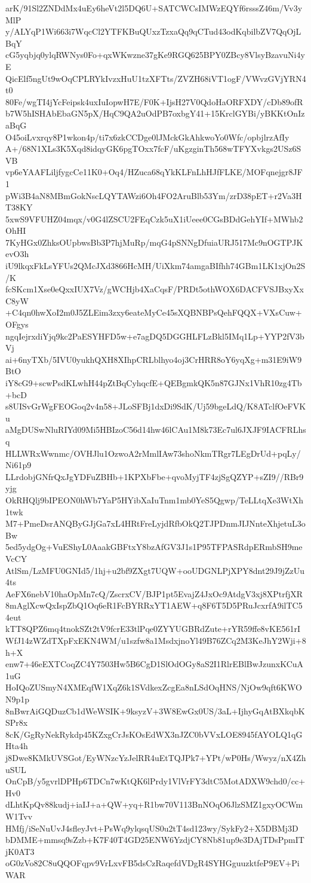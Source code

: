 arK/91Sl2ZNDdMx4uEy6heVt2l5DQ6U+SATCWCsIMWzEQYf6rsssZ46m/Vv3yMlP
y/ALYqP1Wi663i7WqcCl2YTFKBuQUxzTzxaQq9qCTud43odKqbilbZV7QqOjLBqY
cG5yqbjq0ylqRWNys0Fo+qxWKwzne37gKe9RGQ625BPY0ZBcy8VlsyBzavuNi4yE
QicElf5ngUt9wOqCPLRYkIvzxHuU1tzXFTts/ZVZH68iVT1ogF/VWvzGVjYRN4t0
80Fe/wgTI4jYcFeipsk4uxIuIopwH7E/F0K+IjsH27V0QdoHaORFXDY/cDb89ofR
b7W5hISHAbEbaGN5pX/HqC9QA2uOdPB7oxbgY41+15KrclGYBi/yBKKtOnIzaBqG
O45oiLvxrqy8P1wkon4p/ti7x6zkCCDge0lJMckGkAhkwoYo0Wfc/opbjlrzAfIy
A+/68N1XLs3K5Xqd8idqyGK6pgTOxx7fcF/uKgzginTh568wTFYXvkgs2USz6SVB
vp6eYAAFLiljfygcCe11K0+Oq4/HZuca68qYkKLFnLhHJfFLKE/MOFqnejgr8JF1
pWi3B4aN8MBmGokNscLQYTAWzi6Oh4FO2AruBlb53Ym/zrD38pET+r2Va3HT38KY
5xwS9VFUHZ04mqx/v0G4lZSCU2FEqCzk5uX1iUeee0CGsBDdGehYIf+MWhb2OhHI
7KyHGx0ZhksOUpbwsBb3P7hjMuRp/mqG4pSNNgDfuiaURJ517Mc9nOGTPJKevO3h
iU9lkqxFkLsYFUs2QMcJXd3866HcMH/UiXkm74amgaBIfhh74GBm1LK1xjOn2S/K
fcSKcm1Xse0eQxxIUX7Vz/gWCHjb4XaCqsF/PRDt5othWOX6DACFVSJBxyXxC8yW
+C4qn0hwXoI2m0J5ZLEim3zxy6eateMyCe45sXQBNBPsQehFQQX+VXsCuw+OFgys
ngqIejrxdiYjq9kc2PaESYHFD5w+e7agDQ5DGGHLFLzBkl5IMq1Lp+YYP2fV3bVj
ai+6nyTXb/5IVU0yukhQXH8XIhpCRLblhyo4oj3CrHRR8oY6yqXg+m31E9iW9BtO
iY8cG9+scwPsdKLwhH44pZtBqCyhqcfE+QEBgmkQK5n87GJNx1VhR10zg4Tb+bcD
s8UISvGrWgFEOGoq2v4n58+JLoSFBj1dxDi9SdK/Uj59bgeLdQ/K8ATclfOeFVKu
aMgDUSwNluRIYd09Mi5HBIzoC56d14hw46lCAu1M8k73Ec7ul6JXJF9IACFRLhsq
HLLWRxWwnmc/OVHJlu1OzwoA2rMmlIAw73shoNkmTRgr7LEgDrUd+pqLy/Ni61p9
LLrdobjGNfrQxJgYDFuZBHb+1KPXbFbe+qvoMyjTF4zjSgQZYP+sZI9//RBr9yjg
OkRHQlj9bIPEON0hWb7YaP5HYibXaIuTnm1mb0YeS5Qgwp/TeLLtqXe3WtXh1twk
M7+PmeDsrANQByGJjGa7xL4HRtFreLyjdRfbOkQ2TJPDnmJIJNnteXhjetuL3oBw
5ed5ydgOg+VuEShyL0AaakGBFtxY8bzAfGV3J1s1P95TFPASRdpERmbSH9meVcCY
AtlSm/LzMFU0GNId5/1hj+u2bf9ZXgt7UQW+ooUDGNLPjXPY8dnt29J9jZzUu4ts
AeFX6nebV10haOpMn7cQ/ZscrxCV/BJP1pt5EvajZ4JxOc9AtdgV3xj8XPtrfjXR
8mAglXcwQxIspZbQ1Oq6eR1FcBYRRxYT1AEW+q8F6T5D5PRuJcxrfA9ilTC54eut
kTT8QPZ6mq4tnokSZt2tV9fcrE33tlPqe0ZYYUGBRdZute+rYR59ffe8vKE561rI
WfJ14zWZdTXpFxEKN4WM/u1szfw8a1MsdxjnoYl49B76ZCq2M3KeJhY2Wji+8h+X
enw7+46eEXTCoqZC4Y7503Hw5B6CgD1SlOdOGy8aS2I1RlrEBlBwJzunxKCuA1uG
HoIQoZUSmyN4XMEqfW1XqZ6k1SVdkexZcgEa8nLSdOqHNS/NjOw9qft6KWON9p1p
8nBwrAiGQDuzCb1dWeWSIK+9ksyzV+3W8EwGx0US/3aL+IjhyGqAtBXkqbKSPr8x
8cK/GgRyNekRykdp45KZxgCrJsKOsEdWX3nJZC0bVVxLOE8945fAYOLQ1qGHta4h
j8Dwe8KMkUVSGot/EyWNzcYzJelRR4uEtTQJPk7+YPt/wP0Hs/Wwyz/nX4ZhuSUL
OnCpB/y5gvrlDPHp6TDCn7wKtQK6lPrdy1VlVrFY3dtC5MotADXW9chd0/cc+Hv0
dLhtKpQv88kudj+iaIJ+a+QW+yq+R1bw70V113BnNOqO6JlzSMZ1gxyOCWmW1Tvv
HMfj/iSeNuUvJ4sfleyJvt+PsWq9ylqsqUS0u2tT4sd123wy/SykFy2+X5DBMj3D
bDMME+mmsq9sZzb+K7F40T4GD25ENW6YzdjCY8Nb81up9e3DAjTDsPpmITjK0AT3
oG0zVo82C8uQQOFqpv9VrLxvFB5dsCzRaqefdVDgR4SYHGguuzktfeP9EV+PiWAR
